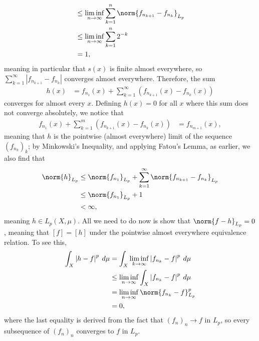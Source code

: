 \documentclass[10pt]{mypackage}
\begin{document}
\begin{enumerate}[(i)]
\begin{align*}
                     &\leq \liminf_{n\rightarrow\infty} \sum_{k=1}^{n} \norm{f_{n_{k+1}} -f_{n_{k}}}_{L_p}\\
                     &\leq \liminf_{n\rightarrow\infty} \sum_{k=1}^{n} 2^{-k}\\
                     &= 1,
    \end{align*}
    meaning in particular that $s(x)$ is finite almost everywhere, so $\sum_{k=1}^{\infty} \left\vert f_{n_{k+1}} -f_{n_{k}} \right\vert$ converges almost everywhere. Therefore, the sum
    \begin{align*}
      h(x) &= f_{n_{1}}(x) + \sum_{k=1}^{\infty} \left( f_{n_{k+1}}(x) - f_{n_{k}}(x) \right)
    \end{align*}
    converges for almost every $x$. Defining $h(x) = 0$ for all $x$ where this sum does not converge absolutely, we notice that
    \begin{align*}
      f_{n_{1}}(x) + \sum_{k=1}^{m}\left( f_{n_{k+1}}(x) - f_{n_{k}}(x) \right) &= f_{n_{m+1}}(x),
    \end{align*}
    meaning that $h$ is the pointwise (almost everywhere) limit of the sequence $\left( f_{n_{k}} \right)_{k}$; by Minkowski's Inequality, and applying Fatou's Lemma, as earlier, we also find that
    \begin{align*}
      \norm{h}_{L_p} &\leq \norm{f_{n_1}}_{L_p} + \sum_{k=1}^{\infty}\norm{f_{n_{k+1}}-f_{n_{k}}}_{L_p}\\
                     &\leq \norm{f_{n_{1}}}_{L_p} + 1\\
                     &< \infty,
    \end{align*}
    meaning $h\in L_{p}\left( X,\mu \right)$. All we need to do now is show that $\norm{f-h}_{L_p} = 0$, meaning that $\left[ f \right] = \left[ h \right]$ under the pointwise almost everywhere equivalence relation. To see this, 
    \begin{align*}
      \int_{X}^{} \left\vert h-f \right\vert^{p}\:d\mu &= \int_{X}^{} \liminf_{k\rightarrow\infty} \left\vert f_{n_{k}} - f \right\vert^{p}\:d\mu\\
                                                       &\leq \liminf_{n\rightarrow\infty} \int_{X}^{} \left\vert f_{n_{k}} - f \right\vert^{p}\:d\mu\\
                                                       &= \liminf_{n\rightarrow\infty} \norm{f_{n_{k}} - f}_{L_p}^{p}\\
                                                       &= 0,
    \end{align*}
    where the last equality is derived from the fact that $\left( f_{n} \right)_n\rightarrow f$ in $L_p$, so every subsequence of $\left( f_{n} \right)_n$ converges to $f$ in $L_p$.
\end{enumerate}
\end{document}
